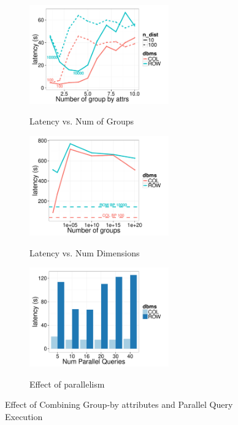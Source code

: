 \begin{figure}[t]
	\centering
	\begin{subfigure}{0.33\linewidth}
		\centering
		{\includegraphics[width=6cm] {Images/multi_gb_same.pdf}}
		\caption{Latency vs. Num of Groups}
		\label{fig:multi_gb_same}
	\end{subfigure}
	\begin{subfigure}{0.33\linewidth}
		\centering
		{\includegraphics[width=6cm] {Images/multi_gb.pdf}}
		\caption{Latency vs. Num Dimensions}
		\label{fig:multi_gb_bp}
	\end{subfigure}
	\begin{subfigure}{0.33\linewidth}
		\centering
		{\includegraphics[width=6cm] {Images/parallel_noop.pdf}}
		\caption{Effect of parallelism}
		\label{fig:parallelism}
	\end{subfigure}
	\vspace{-10pt}
	\caption{Effect of Combining Group-by attributes and Parallel Query Execution}
	\label{fig:bank_perf}
	\vspace{-10pt}
\end{figure}

